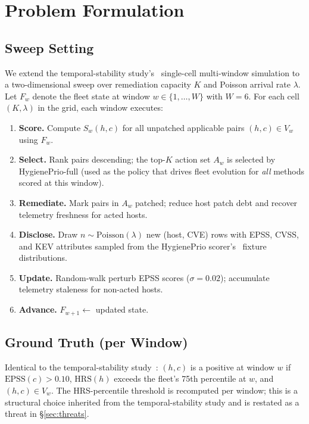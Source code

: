 \section{Problem Formulation}
\label{sec:problem}

\subsection{Sweep Setting}

We extend the temporal-stability study's~\cite{paper5temporal} single-cell multi-window simulation
to a two-dimensional sweep over remediation capacity $K$ and Poisson
arrival rate $\lambda$. Let $F_w$ denote the fleet state at window $w \in
\{1, \ldots, W\}$ with $W = 6$. For each cell $(K, \lambda)$ in the grid,
each window executes:

\begin{enumerate}
\item \textbf{Score.} Compute $S_w(h, c)$ for all unpatched applicable
pairs $(h, c) \in V_w$ using $F_w$.
\item \textbf{Select.} Rank pairs descending; the top-$K$ action set
$A_w$ is selected by HygienePrio-full (used as the policy that drives
fleet evolution for \textit{all} methods scored at this window).
\item \textbf{Remediate.} Mark pairs in $A_w$ patched; reduce host
patch debt and recover telemetry freshness for acted hosts.
\item \textbf{Disclose.} Draw $n \sim \mathrm{Poisson}(\lambda)$ new
(host, CVE) rows with EPSS, CVSS, and KEV attributes sampled from the
HygienePrio scorer's~\cite{paper4hygieneprio} fixture distributions.
\item \textbf{Update.} Random-walk perturb EPSS scores ($\sigma = 0.02$);
accumulate telemetry staleness for non-acted hosts.
\item \textbf{Advance.} $F_{w+1} \leftarrow$ updated state.
\end{enumerate}

\subsection{Ground Truth (per Window)}

Identical to the temporal-stability study~\cite{paper5temporal}: $(h, c)$ is a positive at
window $w$ if $\mathrm{EPSS}(c) > 0.10$, $\mathrm{HRS}(h)$ exceeds the
fleet's 75th percentile at $w$, and $(h, c) \in V_w$. The HRS-percentile
threshold is recomputed per window; this is a structural choice
inherited from the temporal-stability study and is restated as a threat in
\S\ref{sec:threats}.

